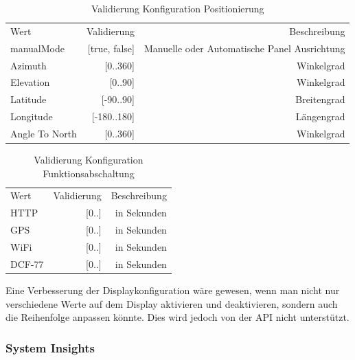   \begin{table}[H]
    \begin{center}
      \begin{tabular}{|l|r|r|}
        \hline
        Wert          & Validierung & Beschreibung\\
        \Xhline{3\arrayrulewidth}
        manualMode & [true, false] & Manuelle oder Automatische Panel Ausrichtung \\
        \hline
        Azimuth      & [0..360]   & Winkelgrad \\
        \hline
        Elevation   & [0..90] & Winkelgrad \\
        \hline
        Latitude   & [-90..90] & Breitengrad \\
        \hline
        Longitude   & [-180..180] & Längengrad \\
        \hline
        Angle To North   & [0..360] & Winkelgrad \\
        \hline
      \end{tabular}
      \caption{Validierung Konfiguration Positionierung}
    \end{center}
  \end{table}

  \begin{table}[H]
    \begin{center}
      \begin{tabular}{|l|r|r|}
        \hline
        Wert          & Validierung & Beschreibung\\
        \Xhline{3\arrayrulewidth}
        HTTP & [0..] & in Sekunden \\
        \hline
        GPS & [0..] & in Sekunden \\
        \hline
        WiFi & [0..] & in Sekunden \\
        \hline
        DCF-77 & [0..] & in Sekunden \\
        \hline
      \end{tabular}
      \caption{Validierung Konfiguration Funktionsabschaltung}
    \end{center}
  \end{table}

Eine Verbesserung der Displaykonfiguration wäre gewesen, wenn man nicht nur verschiedene Werte auf dem Display aktivieren und deaktivieren, sondern auch die Reihenfolge anpassen könnte. Dies wird jedoch von der API nicht unterstützt.

\subsubsection{System Insights}

